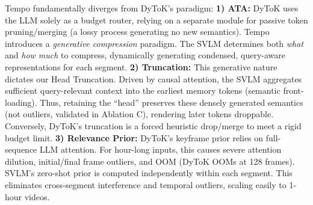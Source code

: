 \vspace{-0.2em}
%
Tempo fundamentally diverges from DyToK's paradigm:
%
\textbf{1) ATA:} DyToK uses the LLM solely as a budget router, relying on a separate module for passive token pruning/merging (a lossy process generating no new semantics). Tempo introduces a \textit{generative compression} paradigm. The SVLM determines both \textit{what} and \textit{how much} to compress, dynamically generating condensed, query-aware representations for each segment.
%
\textbf{2) Truncation:} This generative nature dictates our Head Truncation. Driven by causal attention, the SVLM aggregates sufficient query-relevant context into the earliest memory tokens (semantic front-loading). Thus, retaining the ``head'' preserves these densely generated semantics (not outliers, validated in Ablation C), rendering later tokens droppable. Conversely, DyToK's truncation is a forced heuristic drop/merge to meet a rigid budget limit.
%
\textbf{3) Relevance Prior:} DyToK’s keyframe prior relies on full-sequence LLM attention. For hour-long inputs, this causes severe attention dilution, initial/final frame outliers, and OOM (DyToK OOMs at 128 frames). SVLM’s zero-shot prior is computed independently within each segment. This eliminates cross-segment interference and temporal outliers, scaling easily to 1-hour videos.

